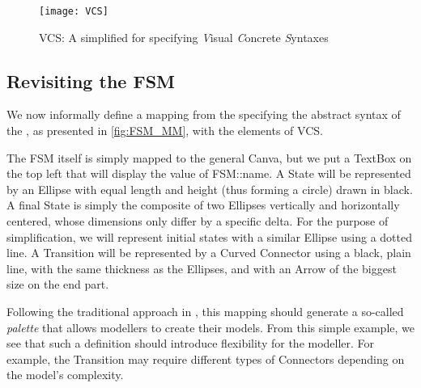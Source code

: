 \begin{figure}[t]%
   \centering
   \texttt{[image: VCS]}%
   \caption{\textsf{VCS}: A simplified \DSL for specifying \emph{V}isual \emph{C}oncrete \emph{S}yntaxes}%
   \label{fig:VCS}%
\end{figure}


\subsection{Revisiting the \textsf{FSM}}
\label{sec:Proposal-FSM-CS}

We now informally define a mapping from the \DSL specifying the abstract syntax 
of the \FSM \DSL, as presented in \autoref{fig:FSM_MM}, with the elements of 
\textsf{VCS}. 

The \textsf{FSM} itself is simply mapped to the general \textsf{Canva}, but we put
a \textsf{TextBox} on the top left that will display the value of \textsf{FSM::name}.
A \textsf{State} will be represented by an \textsf{Ellipse} with equal \textsf{length}
and \textsf{height} (thus forming a circle) drawn in black. A final \textsf{State}
is simply the composite of two \textsf{Ellipse}s vertically and horizontally centered,
whose dimensions only differ by a specific delta. For the purpose of simplification,
we will represent initial states with a similar \textsf{Ellipse} using a dotted line.
A \textsf{Transition} will be represented by a \textsf{Curved} \textsf{Connector}
using a black, plain line, with the same thickness as the \textsf{Ellipse}s, and
with an \textsf{Arrow} of the biggest size on the end part. 

Following the traditional approach in \MDE, this mapping should generate a so-called
\emph{palette} that allows modellers to create their models. From this simple example,
we see that such a definition should introduce flexibility for the modeller. 
For example, the \textsf{Transition} may require different types of \textsf{Connector}s
depending on the model's complexity.
